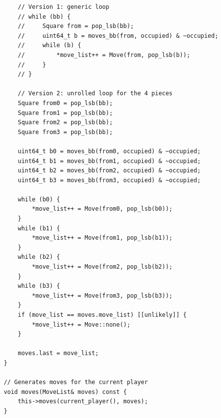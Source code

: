 \documentclass[12pt,a4paper,twoside,openright]{book}
\begin{document}
\begin{mdframed}[skipabove=\baselineskip,topline=false,rightline=false,bottomline=false,leftline=false,linewidth=1pt,linecolor=gray!40,innerleftmargin=8pt]
\begin{verbatim}
        // Version 1: generic loop
        // while (bb) {
        //     Square from = pop_lsb(bb);
        //     uint64_t b = moves_bb(from, occupied) & ~occupied;
        //     while (b) {
        //         *move_list++ = Move(from, pop_lsb(b));
        //     }
        // }

        // Version 2: unrolled loop for the 4 pieces
        Square from0 = pop_lsb(bb);
        Square from1 = pop_lsb(bb);
        Square from2 = pop_lsb(bb);
        Square from3 = pop_lsb(bb);

        uint64_t b0 = moves_bb(from0, occupied) & ~occupied;
        uint64_t b1 = moves_bb(from1, occupied) & ~occupied;
        uint64_t b2 = moves_bb(from2, occupied) & ~occupied;
        uint64_t b3 = moves_bb(from3, occupied) & ~occupied;

        while (b0) {
            *move_list++ = Move(from0, pop_lsb(b0));
        }
        while (b1) {
            *move_list++ = Move(from1, pop_lsb(b1));
        }
        while (b2) {
            *move_list++ = Move(from2, pop_lsb(b2));
        }
        while (b3) {
            *move_list++ = Move(from3, pop_lsb(b3));
        }
        if (move_list == moves.move_list) [[unlikely]] {
            *move_list++ = Move::none();
        }

        moves.last = move_list;
    }

    // Generates moves for the current player
    void moves(MoveList& moves) const {
        this->moves(current_player(), moves);
    }


\end{verbatim}
\end{mdframed}
\end{document}
